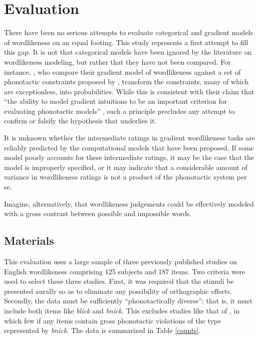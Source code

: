 
\section{Evaluation}
\label{2evaluation}

There have been no serious attempts to evaluate categorical and gradient models of wordlikeness on an equal footing. This study represents a first attempt to fill this gap. It is not that categorical models have been ignored by the literature on wordlikeness modeling, but rather that they have not been compared. For instance, \citet{Hayes2008a}, who compare their gradient model of wordlikeness against a set of phonotactic constraints proposed by \citet{Clements1983}, transform the \citeauthor{Clements1983} constraints, many of which are exceptionless, into probabilities. While this is consistent with their claim that ``the ability to model gradient intuitions to be an important criterion for evaluating phonotactic models'' \citep[382]{Hayes2008a}, such a principle precludes any attempt to confirm or falsify the hypothesis that underlies it. 

It is unknown whether the intermediate ratings in gradient wordlikeness tasks are reliably predicted by the computational models that have been proposed. If some model poorly accounts for these intermediate ratings, it may be the case that the model is improperly specified, or it may indicate that a considerable amount of variance in wordlikeness ratings is not a product of the phonotactic system per se.

Imagine, alternatively, that wordlikeness judgements could be effectively modeled with a gross contrast between possible and impossible words. 


\subsection{Materials}

This evaluation uses a large sample of three previously published studies on English wordlikeness comprising 125 subjects and 187 items. Two criteria were used to select these three studies. First, it was required that the stimuli be presented aurally so as to eliminate any possibility of orthographic effects. Secondly, the data must be sufficiently ``phonotactically diverse'': that is, it must include both items like \emph{blick} and \emph{bnick}. This excludes studies like that of \citet{Bailey2001}, in which few if any items contain gross phonotactic violations of the type represented by \emph{bnick}. The data is summarized in Table \ref{counts}.


